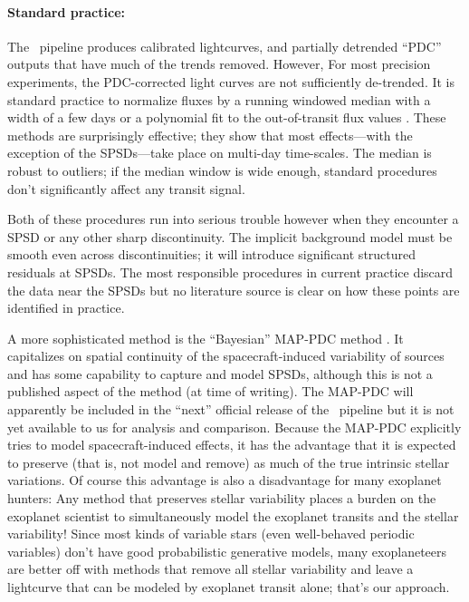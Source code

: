 \documentclass[letterpaper,12pt,preprint]{hack_aastex}
\begin{document}
\paragraph{Standard practice:}
The \Kepler\ pipeline produces calibrated lightcurves, and partially
detrended ``PDC'' outputs that have much of the trends removed.
However, For most precision experiments, the PDC-corrected light curves
are not sufficiently de-trended.
It is standard practice to normalize fluxes by a
running windowed median with a width of a few days \citep{dressing} or a
polynomial fit to the out-of-transit flux values \citep[regions chosen by
hand;][]{autokep}.
These methods are surprisingly effective; they show that most effects---with
the exception of the SPSDs---take place on multi-day time-scales.
The median is robust to outliers; if the median window is
wide enough, standard procedures don't significantly affect any
transit signal.

Both of these procedures run into serious trouble however when they encounter a SPSD
or any other sharp discontinuity.
The implicit background model must be smooth even across discontinuities; it
will introduce significant structured residuals at SPSDs.
The most responsible procedures in current practice discard the data
near the SPSDs but no literature source is clear on how these points are
identified in practice.

A more sophisticated method is the ``Bayesian'' MAP-PDC method
\citep{map-pdc1,map-pdc2}.
It capitalizes on spatial
continuity of the spacecraft-induced variability of sources and
has some capability to capture and model SPSDs, although this is not
a published aspect of the method (at time of writing).
The MAP-PDC will apparently be included in the ``next'' official release of the
\Kepler\ pipeline but it is not yet available to us for analysis and comparison.
Because the MAP-PDC explicitly tries to model spacecraft-induced effects, it
has the advantage that it is expected to preserve (that is, not model and
remove) as much of the true intrinsic stellar variations.
Of course this advantage is also a disadvantage for many exoplanet hunters:
Any method that preserves stellar variability places a burden on the exoplanet
scientist to simultaneously model the exoplanet transits and the stellar
variability!
Since most kinds of variable stars (even well-behaved periodic variables)
don't have good probabilistic generative models, many exoplaneteers are better
off with methods that remove all stellar variability and leave a lightcurve
that can be modeled by exoplanet transit alone; that's our approach.
\end{document}
